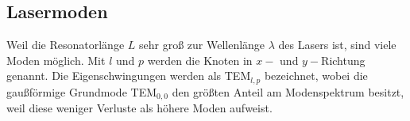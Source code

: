 \subsection{Lasermoden}

Weil die Resonatorlänge $L$ sehr groß zur Wellenlänge $\lambda$ des Lasers ist, sind viele Moden möglich.
Mit $l$ und $p$ werden die Knoten in $x-$ und $y-$Richtung genannt.
Die Eigenschwingungen werden als TEM$_{l,p}$ bezeichnet, wobei die gaußförmige Grundmode TEM$_{0,0}$ den größten Anteil am Modenspektrum besitzt, weil diese weniger Verluste als höhere Moden aufweist.